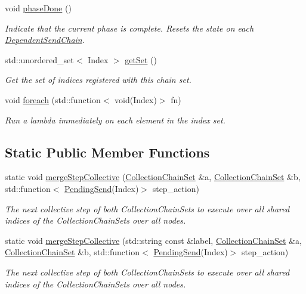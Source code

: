 \begin{DoxyCompactItemize}
void \hyperlink{classvt_1_1messaging_1_1_collection_chain_set_afcb749b22063068d060f35fdcd2320b3}{phase\+Done} ()
\begin{DoxyCompactList}\small\item\em Indicate that the current phase is complete. Resets the state on each {\ttfamily \hyperlink{classvt_1_1messaging_1_1_dependent_send_chain}{Dependent\+Send\+Chain}}. \end{DoxyCompactList}\item 
std\+::unordered\+\_\+set$<$ Index $>$ \hyperlink{classvt_1_1messaging_1_1_collection_chain_set_a17bcba0392b2ae7c68a3c3630b71ffa3}{get\+Set} ()
\begin{DoxyCompactList}\small\item\em Get the set of indices registered with this chain set. \end{DoxyCompactList}\item 
void \hyperlink{classvt_1_1messaging_1_1_collection_chain_set_a5768b5b636799860a63ab182a1e34c9a}{foreach} (std\+::function$<$ void(Index)$>$ fn)
\begin{DoxyCompactList}\small\item\em Run a lambda immediately on each element in the index set. \end{DoxyCompactList}\end{DoxyCompactItemize}
\subsection*{Static Public Member Functions}
\begin{DoxyCompactItemize}
\item 
static void \hyperlink{classvt_1_1messaging_1_1_collection_chain_set_a982745c451229365b57a15a87dc2999e}{merge\+Step\+Collective} (\hyperlink{classvt_1_1messaging_1_1_collection_chain_set}{Collection\+Chain\+Set} \&a, \hyperlink{classvt_1_1messaging_1_1_collection_chain_set}{Collection\+Chain\+Set} \&b, std\+::function$<$ \hyperlink{structvt_1_1messaging_1_1_pending_send}{Pending\+Send}(Index)$>$ step\+\_\+action)
\begin{DoxyCompactList}\small\item\em The next collective step of both Collection\+Chain\+Sets to execute over all shared indices of the Collection\+Chain\+Sets over all nodes. \end{DoxyCompactList}\item 
static void \hyperlink{classvt_1_1messaging_1_1_collection_chain_set_a6560ca64c07967bbd81c57dcd009dd60}{merge\+Step\+Collective} (std\+::string const \&label, \hyperlink{classvt_1_1messaging_1_1_collection_chain_set}{Collection\+Chain\+Set} \&a, \hyperlink{classvt_1_1messaging_1_1_collection_chain_set}{Collection\+Chain\+Set} \&b, std\+::function$<$ \hyperlink{structvt_1_1messaging_1_1_pending_send}{Pending\+Send}(Index)$>$ step\+\_\+action)
\begin{DoxyCompactList}\small\item\em The next collective step of both Collection\+Chain\+Sets to execute over all shared indices of the Collection\+Chain\+Sets over all nodes. \end{DoxyCompactList}\end{DoxyCompactItemize}
